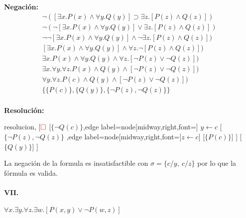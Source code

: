 \documentclass[10pt,a4paper]{article}
\begin{document}
\begin{multicols}{2}
\textbf{Negación:}
\begin{align*}
\lnot([\exists x. P(x) \land \forall y. Q(y)] \supset \exists z. [P(z) \land Q(z)]) \\[1pt]
\lnot(\lnot[\exists x. P(x) \land \forall y. Q(y)] \lor \exists z. [P(z) \land Q(z)]) \\[1pt]
\lnot\lnot[\exists x. P(x) \land \forall y. Q(y)] \land \lnot\exists z. [P(z) \land Q(z)]) \\[1pt]
[\exists x. P(x) \land \forall y. Q(y)] \land \forall z. \lnot[P(z) \land Q(z)]) \\[1pt]
\exists x. P(x) \land \forall y. Q(y) \land \forall z. [\lnot P(z) \lor \lnot Q(z)]) \\[1pt]
\exists x.\forall y. \forall z. P(x) \land  Q(y) \land [\lnot P(z) \lor \lnot Q(z)]) \\[1pt]
\forall y. \forall z. P(c) \land  Q(y) \land [\lnot P(z) \lor \lnot Q(z)]) \\[1pt]
\{\{P(c)\}, \{Q(y)\}, \{\lnot P(z) , \lnot Q(z)\} \}\\[1pt]
\end{align*}

\textbf{Resolución:}
\begin{center}
	\begin{forest} resolucion,
[${\color{red}\Box}$ 
	[$\{\lnot Q(c)\}$,edge label={node[midway,right,font=\footnotesize] {$y\leftarrow c$}}
	    [$\{\lnot P(z) \comma \lnot Q(z)\}$
	    ,edge label={node[midway,right,font=\footnotesize]{$z\leftarrow c$}}]
	    [$\{P(c)\}$]
	]
	[$\{Q(y)\}$]
]
	\end{forest}
\end{center}
La negación de la formula es insatisfactible con $\sigma = \{ c/y,~c/z\}$ por lo que la fórmula es valida.
\end{multicols}

\paragraph{VII.}$\forall x. \exists y. \forall z. \exists w. [P(x,y) \lor \lnot P(w,z)]$
\end{document}
